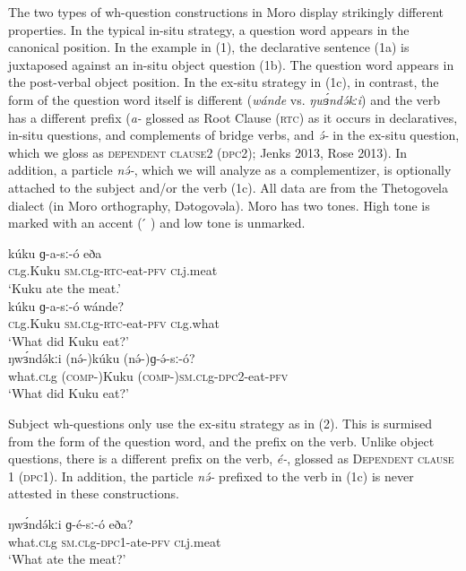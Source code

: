 The two types of wh-question constructions in Moro display strikingly different properties. In the typical in-situ strategy, a question word appears in the canonical position. In the example in (1), the declarative sentence (1a) is juxtaposed against an in-situ object question (1b). The question word appears in the post-verbal object position. In the ex-situ strategy in (1c), in contrast, the form of the question word itself is different (\textit{wánde} vs. \textit{ŋwɜ́ndə́kːi}) and the verb has a different prefix (\textit{a-} glossed as Root Clause (\textsc{rtc}) as it occurs in declaratives, in-situ questions, and complements of bridge verbs, and \textit{ə́-} in the ex-situ question, which we gloss as \textsc{dependent clause}2 (\textsc{dpc}2); Jenks 2013, Rose 2013). In addition, a particle \textit{nə́-}, which we will analyze as a complementizer, is optionally attached to the subject and/or the verb (1c). All data are from the Thetogovela dialect (in Moro orthography, Dətogovəla).  Moro has two tones. High tone is marked with an accent (\hspace{2pt}  ́ ) and low tone is unmarked.

\ea
\ea	\gll kúku         ɡ-a-sː-ó               	eða\\
	\textsc{cl}g.Kuku   \textsc{sm.cl}g-\textsc{rtc}-eat-\textsc{pfv}	\textsc{cl}j.meat     	\\		     	     \trans ‘Kuku ate the meat.’\\
\ex	\gll kúku	ɡ-a-sː-ó	wánde?\\
	\textsc{cl}g.Kuku	\textsc{sm.cl}g-\textsc{rtc}-eat-\textsc{pfv}   	\textsc{cl}g.what\\
	\trans ‘What did Kuku eat?’\\
\ex	\gll ŋwɜ́ndə́kːi	(nə́-)kúku     	(nə́-)ɡ-ə́-sː-ó?                \\
	what.\textsc{cl}g	(\textsc{comp-})Kuku  	(\textsc{comp-})\textsc{sm.cl}g-\textsc{dpc}2-eat-\textsc{pfv}  \\
	\trans ‘What did Kuku eat?’\\
\z
\z

Subject wh-questions only use the ex-situ strategy as in (2). This is surmised from the form of the question word, and the prefix on the verb. Unlike object questions, there is a different prefix on the verb, \textit{é-}, glossed as \textsc{Dependent clause} 1 (\textsc{dpc}1). In addition, the particle \textit{nə́-} prefixed to the verb in (1c) is never attested in these constructions. 

\ea
\ea		\gll ŋwɜ́ndə́kːi	ɡ-é-sː-ó        	eða?		\\
what.\textsc{cl}g	\textsc{sm.cl}g-\textsc{dpc}1-ate-\textsc{pfv}	\textsc{cl}j.meat\\
\trans		‘What ate the meat?’	\\
\z
\z

